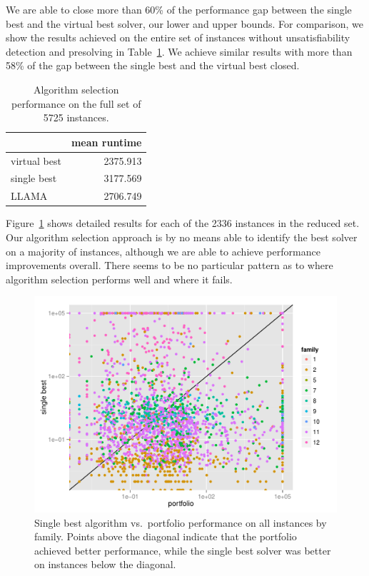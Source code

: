 \documentclass{llncs}
\begin{document}
We are able to close more than 60\% of the performance gap between the single
best and the virtual best solver, our lower and upper bounds. For comparison, we
show the results achieved on the entire set of instances without
unsatisfiability detection and presolving in Table~\ref{tab:resfull}. We achieve
similar results with more than 58\% of the gap between the single best and the
virtual best closed.

\begin{table}[ht]
\centering
\begin{tabular}{lr}
  \toprule
& mean runtime\\
  \midrule
virtual best & 2375.913\\
  single best & 3177.569\\
  LLAMA & 2706.749\\
   \bottomrule
\end{tabular}
\vspace{1ex}
\caption{Algorithm selection performance on the full set of 5725
instances.}\label{tab:resfull}
\end{table}

Figure~\ref{fig:scatter} shows detailed results for each of the 2336 instances
in the reduced set. Our algorithm selection approach is by no means able to
identify the best solver on a majority of instances, although we are able to
achieve performance improvements overall. There seems to be no particular
pattern as to where algorithm selection performs well and where it fails.

\begin{figure}[!ht]
\includegraphics[width=\textwidth]{figures/perfScatter}
\caption{Single best algorithm vs.\ portfolio performance on all instances by
family. Points above the diagonal indicate that the portfolio achieved better
performance, while the single best solver was better on instances below the
diagonal.}
\label{fig:scatter}
\end{figure}
\end{document}
